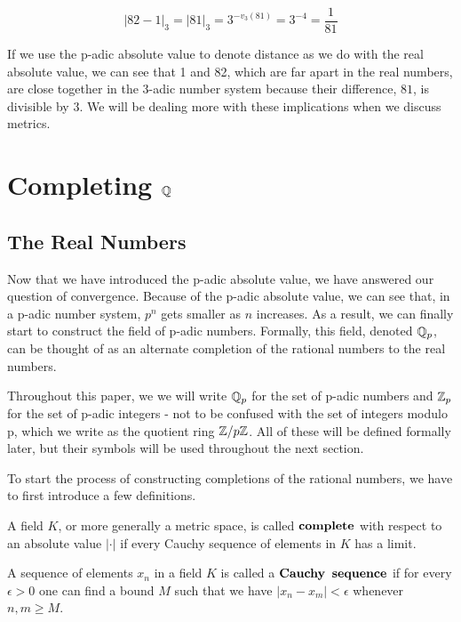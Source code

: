 \documentclass[a4paper]{article}
\begin{document}
\[
	|82-1|_3=|81|_3=3^{-v_3(81)}=3^{-4}=\frac{1}{81}
\]

If we use the p-adic absolute value to denote distance as we do
with the real absolute value, we can see that 1 and 82, which 
are far apart in the real numbers, are close together in the 3-adic
number system because their difference, $81$, is divisible by $3$.
We will be dealing more with these implications when we discuss
metrics.

\section{Completing $\mathbb Q$}

\subsection{The Real Numbers}

Now that we have introduced the p-adic absolute value, we have answered
our question of convergence.  Because of the p-adic absolute value, we
can see that, in a p-adic number system, $p^n$ gets smaller as $n$
increases. As a result, we can finally start to construct the field of
p-adic numbers.  Formally, this field, denoted $\mathbb Q_p$, can be thought
of as an alternate completion of the rational numbers to the real
numbers.  

\begin{remark}
Throughout this paper, we we will write $\mathbb Q_p$ for the set of p-adic
numbers and $\mathbb Z_p$ for the set of p-adic integers - not to be confused
with the set of integers modulo p, which we write as the quotient ring 
$\mathbb Z/p\mathbb Z$.  All of these will be defined formally later, but their
symbols will be used throughout the next section.
\end{remark}

To start the process of constructing completions of the rational
numbers, we have to first introduce a few definitions.

\begin{definition}[Completion]
A field $K$, or more generally a metric space, is called 
$\bf{complete}$ with respect to an absolute value $|\cdot|$ if
every Cauchy sequence of elements in $K$ has a limit.
\end{definition}

\begin{definition}
A sequence of elements $x_n$ in a field $K$ is called a 
$\bf{Cauchy\;\;sequence}$ if for every $\epsilon>0$ one can find a
bound $M$ such that we have $|x_n-x_m|<\epsilon$ whenever $n,m\geq
M$.
\end{definition}
\end{document}
